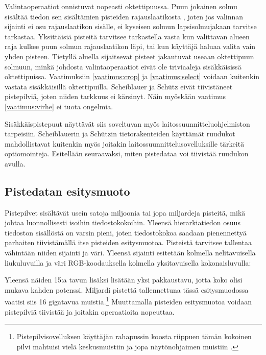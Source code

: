 Valintaoperaatiot onnistuvat nopeasti oktettipuussa. Puun jokainen solmu sisältää tiedon sen sisältämien pisteiden rajauslaatikosta , joten jos valinnan sijainti ei osu rajauslaatikon sisälle, ei kyseisen solmun lapsisolmujakaan tarvitse tarkastaa. Yksittäisiä pisteitä tarvitsee tarkastella vasta kun valittavan alueen raja kulkee puun solmun rajauslaatikon läpi, tai kun käyttäjä haluaa valita vain yhden pisteen. Tietyllä aluella sijaitsevat pisteet jakautuvat useaan oktettipuun solmuun, minkä johdosta valintaoperaatiot eivät ole triviaaleja sisäkkäisissä oktettipuissa. Vaatimuksiin \ref{vaatimus:crop} ja \ref{vaatimus:select} voidaan kuitenkin vastata sisäkkäisillä oktettipuilla. Scheiblauer ja Schütz eivät tiivistäneet pistepilviä, joten niiden tarkkuus ei kärsinyt. Näin myöskään vaatimus \ref{vaatimus:virhe} ei tuota ongelmia.

Sisäkkäispistepuut näyttävät siis soveltuvan myös laitossuunnitteluohjelmiston tarpeisiin. Scheiblauerin ja Schützin tietorakenteiden käyttämät ruudukot mahdollistavat kuitenkin myös joitakin laitossuunnittelusovelluksille tärkeitä optiomointeja. Esitellään seuraavaksi, miten pistedataa voi tiivistää ruudukon avulla.


\subsection{Pistedatan esitysmuoto}\label{kompressio}

Pistepilvet sisältävät usein satoja miljoonia tai jopa miljardeja pisteitä, mikä johtaa luonnollisesti isoihin tiedostokokoihin. Yleensä hierarkiatiedon osuus tiedoston sisällöstä on varsin pieni, joten tiedostokokoa saadaan pienennettyä parhaiten tiivistämällä itse pisteiden esitysmuotoa. Pisteistä tarvitsee tallentaa vähintään niiden sijainti ja väri. Yleensä sijainti esitetään kolmella nelitavuisella liukuluvuilla ja väri RGB-koodauksella kolmella yksitavuisella kokonaisluvulla:


\noindent Yleensä näiden 15:a tavun lisäksi lisätään yksi pakkaustavu, jotta koko olisi mukava kahden potenssi. Miljardi pistettä tallennettuna tässä esitysmuodossa vaatisi siis 16 gigatavua muistia.\footnote{Pistepilvisovelluksen käyttäjän rahapussin koosta riippuen tämän kokoinen pilvi mahtuisi vielä keskusmuistiin ja jopa näytönohjaimen muistiin \cite{rtx}.} Muuttamalla pisteiden esitysmuotoa voidaan pistepilviä tiivistää ja joitakin operaatioita nopeuttaa.

